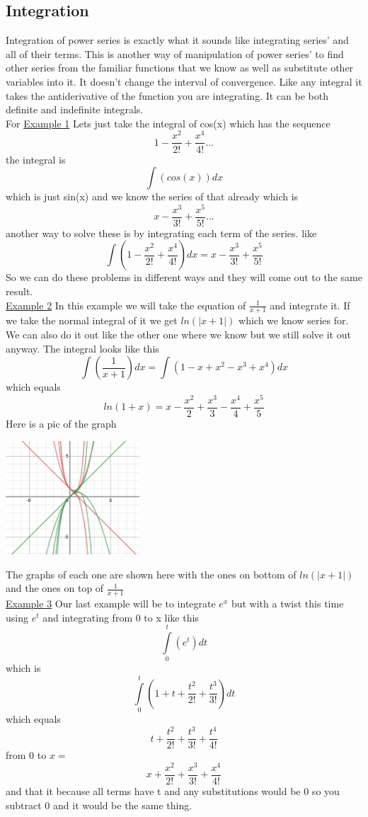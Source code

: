 \documentclass[a4paper,openright, 14pt]{article}
\begin{document}
\subsection{Integration}
Integration of power series is exactly what it sounds like integrating series' and all of their terms. This is another way of manipulation of power series' to find other series from the familiar functions that we know as well as substitute other variables into it. It doesn't change the interval of convergence. Like any integral it takes the antiderivative of the function you are integrating. It can be both definite and indefinite integrals.
\\For 
\underline{Example 1} 
Lets just take the integral of cos(x) which has the sequence $$1-\frac{x^2}{2!}+\frac{x^4}{4!}...$$ the integral is 
$$ \int(cos(x))dx$$ which is just sin(x) and we know the series of that already which is $$x-\frac{x^3}{3!}+\frac{x^5}{5!}...$$ another way to solve these is by integrating each term of the series. like $$\int(1-\frac{x^2}{2!}+\frac{x^4}{4!})dx=x-\frac{x^3}{3!}+\frac{x^5}{5!}$$
So we can do these problems in different ways and they will come out to the same result.
\\\underline{Example 2}
In this example we will take the equation of $\frac{1}{x+1}$ and integrate it. If we take the normal integral of it we get $ln(|x+1|)$ which we know series for. We can also do it out like the other one where we know but we still solve it out anyway. The integral looks like this $$ \int(\frac{1}{x+1})dx=\int(1-x+x^2-x^3+x^4)dx$$ which equals $$ln(1+x)=x-\frac{x^2}{2}+\frac{x^3}{3}-\frac{x^4}{4}+\frac{x^5}{5}$$
Here is a pic of the graph
\begin{center}
    \includegraphics[width = 5cm, height = 5 cm]{ihatethis.png}
\end{center} 
The graphs of each one are shown here with the ones on bottom of $ln(|x+1|)$ and the ones on top of $\frac{1}{x+1}$
\\\underline{Example 3}
Our last example will be to integrate $e^x$ but
 with a twist this time using $e^t$ and integrating from 0 to x like this $$\int\limits_0 ^t(e^t)dt$$ which is $$\int\limits_0 ^t(1+t+\frac{t^2}{2!}+\frac{t^3}{3!})dt$$ which equals $$t+\frac{t^2}{2!}+\frac{t^3}{3!}+\frac{t^4}{4!}$$ from 0 to $x=$ $$x+\frac{x^2}{2!}+\frac{x^3}{3!}+\frac{x^4}{4!}$$ and that it because all terms have t and any substitutions would be 0 so you subtract 0 and it would be the same thing.
 
\end{document}
